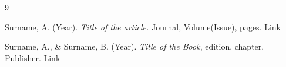 \documentclass{lecturenotes}
\begin{document}
\begin{thebibliography}{9}

 Surname, A. (Year). \textit{Title of the article.}
Journal, Volume(Issue), pages. \href{https://doi.org/}{Link}

 Surname, A., \& Surname, B. (Year). \textit{Title of the
Book}, edition, chapter. Publisher. \href{https://doi.org/}{Link}

\end{thebibliography}
\end{document}
